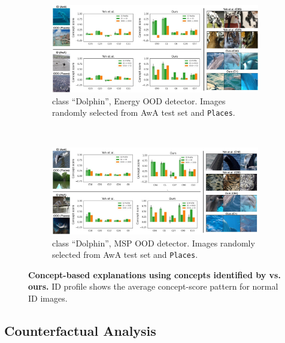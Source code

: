 \begin{figure}\ContinuedFloat
  \centering
  \begin{subfigure}{\linewidth}
    \includegraphics[width=\textwidth]{figures/energy-dolphin.jpg}
    \caption{class ``Dolphin'', Energy OOD detector. Images randomly selected from AwA test set and \texttt{Places}.}
    \label{fig:expl-energy-dolphin}
  \end{subfigure}
  \\
  \begin{subfigure}{\linewidth}
    \includegraphics[width=\textwidth]{figures/MSP_Places_Dolphin.jpg}
    \caption{class ``Dolphin'', MSP OOD detector. Images randomly selected from AwA test set and \texttt{Places}.}
    \label{fig:expl-msp-dolphin}
  \end{subfigure}
  \vspace{.1in}
  \caption{\textbf{Concept-based explanations using concepts identified by \citet{yeh2020completeness} vs. ours.}
ID profile shows the average concept-score pattern for normal ID images.}
\label{fig:expl-additional1}
\end{figure}

\iffalse
\newpage
\subsection{Counterfactual Analysis}
\label{sec:appendix-counterfactual}

